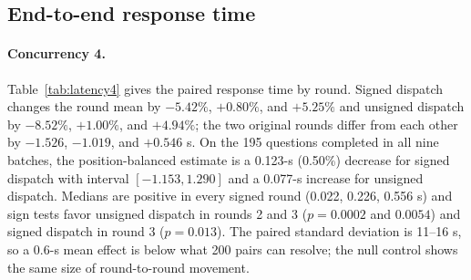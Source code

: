 \documentclass[paper]{ieice}
\begin{document}
\subsection{End-to-end response time}
\paragraph{Concurrency 4.}
Table~\ref{tab:latency4} gives the paired response time by round. Signed dispatch changes the round mean by $-5.42\%$, $+0.80\%$, and $+5.25\%$ and unsigned dispatch by $-8.52\%$, $+1.00\%$, and $+4.94\%$; the two original rounds differ from each other by $-1.526$, $-1.019$, and $+0.546$ s. On the 195 questions completed in all nine batches, the position-balanced estimate is a 0.123-s (0.50\%) decrease for signed dispatch with interval $[-1.153,1.290]$ and a 0.077-s increase for unsigned dispatch. Medians are positive in every signed round (0.022, 0.226, 0.556 s) and sign tests favor unsigned dispatch in rounds 2 and 3 ($p=0.0002$ and $0.0054$) and signed dispatch in round 3 ($p=0.013$). The paired standard deviation is 11--16 s, so a 0.6-s mean effect is below what 200 pairs can resolve; the null control shows the same size of round-to-round movement.
\end{document}
